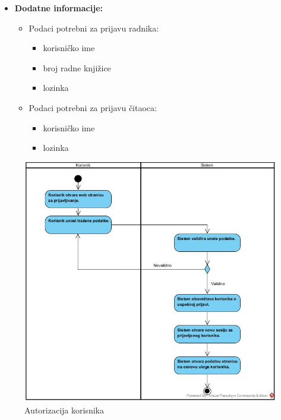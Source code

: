 \documentclass{article}
\begin{document}
\begin{itemize}
\begin{itemize}
		\end{itemize}
	\item \textbf{Dodatne informacije:}
        \begin{itemize}
            \item  Podaci potrebni za prijavu radnika:
                \begin{itemize}
                    \item korisničko ime
                    \item broj radne knjižice
                    \item lozinka
                \end{itemize}
             \item  Podaci potrebni za prijavu čitaoca:
                \begin{itemize}
                    \item korisničko ime
                    \item lozinka
                \end{itemize}
        \end{itemize}
\end{itemize}


\begin{figure}[htbp!]
    \centering
    \includegraphics[scale=0.6]{Autorizacija_korisnika.jpg}
    \caption{Autorizacija korisnika}
    \label{slk:dtp}
\end{figure}
\end{document}
